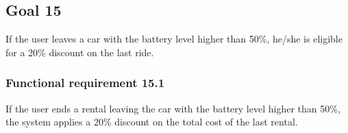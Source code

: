 \subsection{Goal 15}
If the user leaves a car with the battery level higher than 50\%, he/she is eligible for a 20\% discount on the last ride.

\setcounter{secnumdepth}{3}
\subsubsection{Functional requirement 15.1}
If the user ends a rental leaving the car with the battery level higher than 50\%, the system applies a 20\% discount on the total cost of the last rental.
